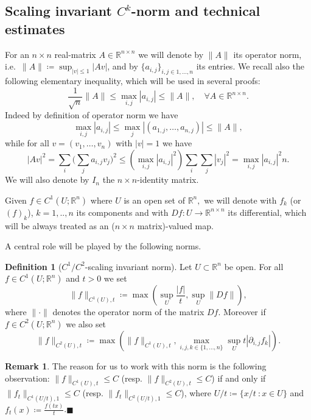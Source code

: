 \documentclass[11pt]{article}
\newcommand{\rr}{\mathbb{R}}
\newcommand{\fr}{\penalty-20\null\hfill$\blacksquare$}
\theoremstyle{plain}
\theoremstyle{definition}
\newtheorem{definition}[theorem]{Definition}
\newtheorem{remark}[theorem]{Remark}
\numberwithin{equation}{section}
\begin{document}
\subsection{Scaling invariant \texorpdfstring{$C^k$}{Ck}-norm and technical estimates}\label{sec:ck norm}
For an $n\times n$ real-matrix $A\in\rr^{n\times n}$ we will denote by $\|A\|$ its operator norm, i.e.\ $\|A\|\coloneqq \sup_{|v|\le 1} |A v|$, and by $\{a_{i,j}\}_{i,j\in{1,...,n}}$ its entries.  We recall also the following elementary inequality, which will be used in several proofs: 
\begin{equation}\label{opnorm}
	\frac{1}{\sqrt n}\|A\|\le \max_{i,j}|a_{i,j}|\le \|A\|, \quad \forall A \in \rr^{n \times n}.
\end{equation}
Indeed by definition of operator norm we have 
$$\max_{i,j}|a_{i,j}|\le \max_j|(a_{1,j},\dots,a_{n,j})|\le \|A\|,$$
while for all $v=(v_1,\dots,v_n)$ with $|v|=1$ we have
\[
|A v|^2=\sum_i \big(\sum_j a_{i,j}v_j\big)^2\le     \left(\max_{i,j}|a_{i,j}|^2\right) \sum_i \sum_j |v_j|^2= \max_{i,j}|a_{i,j}|^2 n.
\]
We will also denote by $I_n$ the $n\times n$-identity matrix.

Given  $f\in C^1(U;\rr^n)$  where $U$ is an open set of $\rr^n,$  we will denote with $f_k$ (or $(f)_k$), $k=1,..,n$ its components and with $Df: U \to \rr^{n\times n}$ its differential, which will be always treated as an ($n\times n$ matrix)-valued map.

A central role will be played by the following norms.
\begin{definition}[$C^1/C^2$-scaling invariant norm]
	Let $U\subset \rr^n$ be open. For all $f\in C^1(U;\rr^n)$ and  $t>0$ we set
	\[ \|f\|_{C^1(U),t}\coloneqq \max\left(\sup_{U}  \frac{|f|}t, \sup_{U}  \|D f\|\right), \]
	 where $\|\cdot \|$ denotes the operator norm of the matrix $Df$. Moreover if $f\in C^2(U;\rr^n)$ we also set
  \[
   \|f\|_{C^2(U),t}\coloneqq \max\left(\|f\|_{C^1(U),t}, \max_{i,j,k\in\{1,\dots,n\}} \sup_{U}   t|\partial_{i,j}f_k | \right).
  \]
\end{definition}


\begin{remark}\label{rmk:scaling invariant}
	The reason for us to work with this norm is the following observation: 
	$\|f\|_{C^1(U),t}\le C$ (resp.  $\|f\|_{C^2(U),t}\le C$) if and only if  $\|f_t\|_{C^1(U/t),1}\le C$ (resp.  $\|f_t\|_{C^2(U/t),1}\le C$),  where $U/t\coloneqq \{x/t \ : x \in U\}$ and $f_t(x)\coloneqq\frac{f(tx)}{t}$.\fr
\end{remark}
\end{document}
